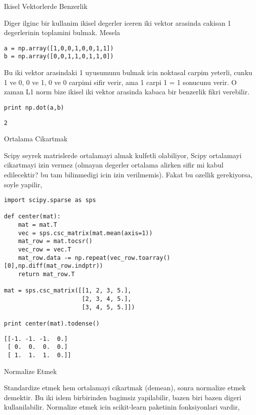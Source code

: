 \documentclass[12pt,fleqn]{article}\usepackage{../common}
\begin{document}
Ikisel Vektorlerde Benzerlik

Diger ilginc bir kullanim ikisel degerler iceren iki vektor arasinda
cakisan 1 degerlerinin toplamini bulmak. Mesela 

\begin{verbatim}
a = np.array([1,0,0,1,0,0,1,1])
b = np.array([0,0,1,1,0,1,1,0])
\end{verbatim}

Bu iki vektor arasindaki 1 uyusumunu bulmak icin noktasal carpim yeterli,
cunku 1 ve 0, 0 ve 1, 0 ve 0 carpimi sifir verir, ama 1 carpi 1 = 1
sonucunu verir. O zaman L1 norm bize ikisel iki vektor arasinda kabaca bir
benzerlik fikri verebilir.

\begin{verbatim}
print np.dot(a,b)
\end{verbatim}

\begin{verbatim}
2
\end{verbatim}

Ortalama Cikartmak 

Scipy seyrek matrislerde ortalamayi almak kulfetli olabiliyor, Scipy
ortalamayi cikartmayi izin vermez (olmayan degerler ortalama alirken sifir
mi kabul edilecektir? bu tam bilinmedigi icin izin verilmemis). Fakat bu
ozellik gerekiyorsa, soyle yapilir,

\begin{verbatim}
import scipy.sparse as sps

def center(mat):
    mat = mat.T
    vec = sps.csc_matrix(mat.mean(axis=1))
    mat_row = mat.tocsr()
    vec_row = vec.T
    mat_row.data -= np.repeat(vec_row.toarray()[0],np.diff(mat_row.indptr))
    return mat_row.T

mat = sps.csc_matrix([[1, 2, 3, 5.],
                      [2, 3, 4, 5.],
                      [3, 4, 5, 5.]])

print center(mat).todense()
\end{verbatim}

\begin{verbatim}
[[-1. -1. -1.  0.]
 [ 0.  0.  0.  0.]
 [ 1.  1.  1.  0.]]
\end{verbatim}

Normalize Etmek 

Standardize etmek hem ortalamayi cikartmak (demean), sonra normalize etmek
demektir. Bu iki islem birbirinden bagimsiz yapilabilir, bazen biri bazen
digeri kullanilabilir. Normalize etmek icin scikit-learn paketinin
fonksiyonlari vardir, 
\end{document}

